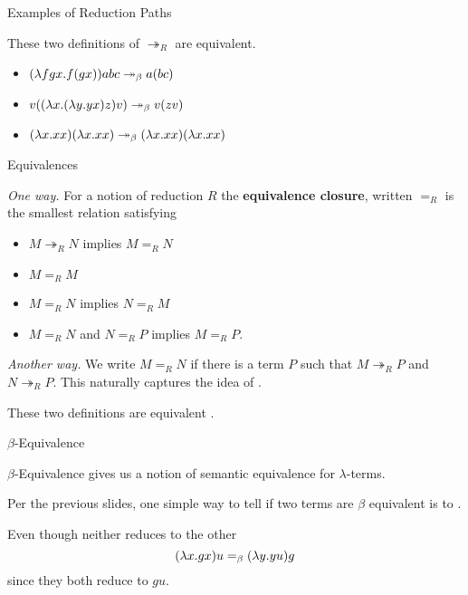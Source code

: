 \documentclass[10pt]{beamer}
\begin{document}
\begin{frame}{Examples of Reduction Paths}

\begin{lemma}
These two definitions of $\twoheadrightarrow_R$ are equivalent.
\end{lemma}
\nxt

\begin{example}
\begin{itemize}
\item $(\lambda f g x. f (g x)) a b c \twoheadrightarrow_\beta a(b c)$
\item $v((\lambda x . (\lambda y . yx)z) v) \twoheadrightarrow_\beta v(zv)$
\item $(\lambda x . xx) (\lambda x . xx) \twoheadrightarrow_\beta (\lambda x . xx) (\lambda x . xx)$
\end{itemize}
\end{example}

\end{frame}

\begin{frame}{Equivalences}

\textit{One way.}
For a notion of reduction $R$ the \textbf{equivalence closure}, written $=_R$ is the smallest relation satisfying
\begin{itemize}
\item $M \twoheadrightarrow_R N$ implies $M =_R N$
\item $M =_R M$
\item $M =_R N$ implies $N =_R M$
\item $M =_R N$ and $N =_R P$ implies $M =_R P$.
\end{itemize}
\nxt

\textit{Another way.}
We write $M =_R N$ if there is a term $P$ such that $M \twoheadrightarrow_R P$ and $N \twoheadrightarrow_R P$. This naturally captures the idea of .
\nxt

\begin{theorem}
These two definitions are equivalent .
\end{theorem}
\end{frame}

\begin{frame}{$\beta$-Equivalence}

\begin{important}
$\beta$-Equivalence gives us a notion of semantic equivalence for  $\lambda$-terms.
\end{important}
\nxt

Per the previous slides, one simple way to tell if two terms are $\beta$ equivalent is to .
\nxt

\begin{example}
Even though neither reduces to the other
\begin{displaymath}
(\lambda x. g x)u =_\beta (\lambda y . yu) g
\end{displaymath}
since they both reduce to $gu$.
\end{example}

\end{frame}
\end{document}
